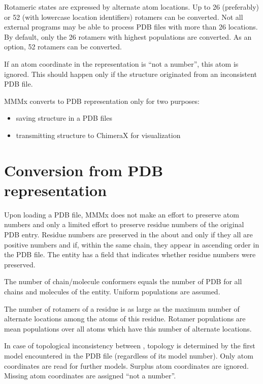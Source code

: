 \documentclass[letterpaper,10pt,english]{sphinxmanual}
\begin{document}
Rotameric states are expressed by alternate atom locations. Up to 26 (preferably) or 52 (with lower\sphinxhyphen{}case location identifiers) rotamers can be converted.
Not all external programs may be able to process PDB files with more than 26 locations. By default, only the 26 rotamers with highest populations are converted.
As an option, 52 rotamers can be converted.

If an atom coordinate in the  representation is “not a number”, this atom is ignored.
This should happen only if the structure originated from an inconsistent PDB file.

MMMx converts to PDB representation only for two purposes:
\begin{itemize}
\item {} 
saving structure in a PDB files

\item {} 
transmitting structure to ChimeraX for visualization

\end{itemize}


\section{Conversion from PDB representation}
\label{\detokenize{MMMx_atomic:conversion-from-pdb-representation}}
Upon loading a PDB file, MMMx does not make an effort to preserve atom numbers and only a limited effort to preserve residue numbers of the original PDB entry.
Residue numbers are preserved in the about  and only if they all are positive numbers and if, within the same chain, they appear in ascending order in the PDB file.
The entity has a field  that indicates whether residue numbers were preserved.

The number of chain/molecule conformers equals the number of PDB  for all chains and molecules of the entity. Uniform populations are assumed.

The number of rotamers of a residue is as large as the maximum number of alternate locations among the atoms of this residue.
Rotamer populations are mean populations over all atoms which have this number of alternate locations.

In case of topological inconsistency between , topology is determined by the first model encountered in the PDB file (regardless of its model number).
Only atom coordinates are read for further models. Surplus atom coordinates are ignored. Missing atom coordinates are assigned “not a number”.
\end{document}
